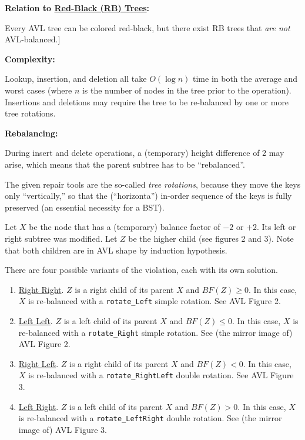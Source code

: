 \documentclass[12pt]{article}
\newcommand{\vspp}{\vspace{1.5mm}}
\begin{document}
	\noindent\textbf{Relation to \hyperref[sec:RB]{Red-Black (RB) Trees}:}
	
	Every AVL tree can be colored red-black, but there exist RB trees that \emph{are not} AVL-balanced.]\vspp
	
	\noindent\textbf{Complexity:}
	
	Lookup, insertion, and deletion all take $O(\log n)$ time in both the average and worst cases (where $n$ is the number of nodes in the tree prior to the operation). Insertions and deletions may require the tree to be re-balanced by one or more tree rotations.\vspp
	
	\noindent\textbf{Rebalancing:}
	
	During insert and delete operations, a (temporary) height difference of 2 may arise, which means that the parent subtree has to be ``rebalanced''. 
	
	The given repair tools are the so-called \emph{tree rotations}, because they move the keys only ``vertically,'' so that the (``horizonta'') in-order sequence of the keys is fully preserved (an essential necessity for a BST).

	Let $X$ be the node that has a (temporary) balance factor of $−2$ or $+2$. Its left or right subtree was modified. Let $Z$ be the higher child (see figures 2 and 3). Note that both children are in AVL shape by induction hypothesis.
	
	There are four possible variants of the violation, each with its own solution.
	\begin{enumerate}[label=(\roman*),leftmargin=16.5mm]
		\item \ul{Right Right}. $Z$ is a right child of its parent $X$ and $BF(Z)\geq 0$. In this case, $X$ is re-balanced with a \texttt{rotate\_Left} simple rotation. See AVL Figure 2.
	
		\item \ul{Left Left}. $Z$ is a left child of its parent $X$ and $BF(Z)\leq 0$. In this case, $X$ is re-balanced with a \texttt{rotate\_Right} simple rotation. See (the mirror image of) AVL Figure 2.
		
		\item \ul{Right Left}. $Z$ is a right child of its parent $X$ and $BF(Z)< 0$. In this case, $X$ is re-balanced with a \texttt{rotate\_RightLeft} double rotation. See AVL Figure 3.
		
		\item \ul{Left Right}. $Z$ is a left child of its parent $X$ and $BF(Z) > 0$. In this case, $X$ is re-balanced with a \texttt{rotate\_LeftRight} double rotation. See (the mirror image of) AVL Figure 3.
	\end{enumerate}
	
\end{document}
